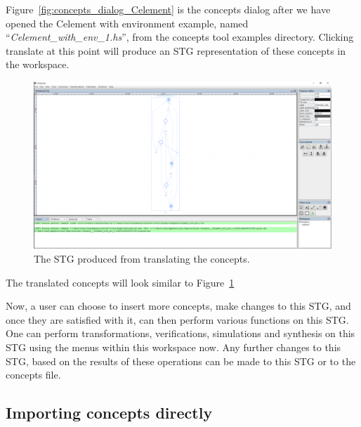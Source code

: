 \documentclass{proc}
\begin{document}
Figure~\ref{fig:concepts_dialog_Celement} is the concepts dialog after we have opened the Celement with environment example, named ``\emph{Celement\_with\_env\_1.hs}'', from the 
concepts tool examples directory. Clicking translate at this point will produce an STG representation of these concepts in the workspace. 

\begin{figure}[H]
\begin{centering}
\includegraphics[scale=0.2]{images/concepts_translated}
\par\end{centering}

\begin{centering}
\protect\caption{\label{fig:concepts_translated}The STG produced from translating the concepts.}

\par\end{centering}

\end{figure}

The translated concepts will look similar to Figure~\ref{fig:concepts_translated}

Now, a user can choose to insert more concepts, make changes to this STG, and once they are satisfied with it, can then perform various functions on this STG. One can perform 
transformations, verifications, simulations and synthesis on this STG using the menus within this workspace now. Any further changes to this STG, based on the results of these operations 
can be made to this STG or to the concepts file. 

\subsection{Importing concepts directly}
\end{document}

